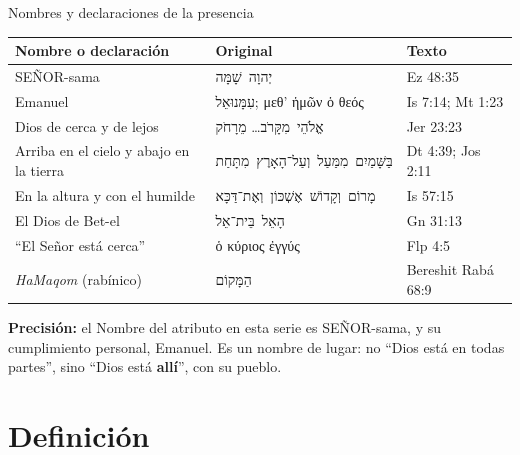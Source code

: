 \documentclass[hyperref={bookmarks=false},aspectratio=169]{beamer}
\newcommand{\heb}[1]{\mbox{\foreignlanguage{hebrew}{#1}}}
\newcommand{\grc}[1]{\foreignlanguage{ancientgreek}{#1}}
\newcommand{\SENOR}{S{\fontsize{0.78em}{1em}\selectfont EÑOR}}
\newcommand{\destacar}[1]{\textbf{\textcolor{azul}{#1}}}
\newcommand{\precision}[1]{{\footnotesize\color{gris}\textbf{Precisión:} #1}}
\begin{document}
\begin{frame}{Nombres y declaraciones de la presencia}
\scriptsize\renewcommand{\arraystretch}{1.12}
\begin{tabular}{@{}>{\RaggedRight\arraybackslash}p{4.4cm}>{\RaggedRight\arraybackslash}p{4.6cm}>{\RaggedRight\arraybackslash}p{2.7cm}@{}}
\toprule
\textbf{Nombre o declaración} & \textbf{Original} & \textbf{Texto} \\ \midrule
\SENOR-sama & \heb{יְהוָה שָׁמָּה} & Ez 48:35 \\
Emanuel & \heb{עִמָּנוּאֵל}; \grc{μεθ’ ἡμῶν ὁ θεός} & Is 7:14; Mt 1:23 \\
Dios de cerca y de lejos & \heb{אֱלֹהֵי מִקָּרֹב}\ldots{} \heb{מֵרָחֹק} & Jer 23:23 \\
Arriba en el cielo y abajo en la tierra & \heb{בַּשָּׁמַיִם מִמַּעַל וְעַל־הָאָרֶץ מִתָּחַת} & Dt 4:39; Jos 2:11 \\
En la altura y con el humilde & \heb{מָרוֹם וְקָדוֹשׁ אֶשְׁכּוֹן וְאֶת־דַּכָּא} & Is 57:15 \\
El Dios de Bet-el & \heb{הָאֵל בֵּית־אֵל} & Gn 31:13 \\
``El Señor está cerca'' & \grc{ὁ κύριος ἐγγύς} & Flp 4:5 \\
\emph{HaMaqom} (rabínico) & \heb{הַמָּקוֹם} & Bereshit Rabá 68:9 \\
\bottomrule
\end{tabular}\par\smallskip
\precision{el Nombre del atributo en esta serie es \SENOR-sama, y su cumplimiento personal, Emanuel. Es un nombre de lugar: no ``Dios está en todas partes'', sino ``Dios está \destacar{allí}'', con su pueblo.}
\end{frame}

\section{Definición}
\end{document}
